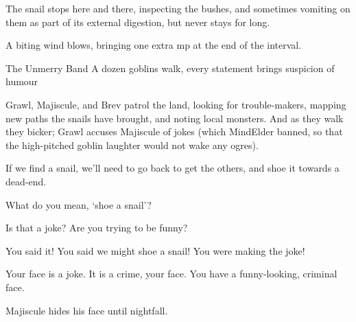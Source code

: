 The snail stops here and there, inspecting the bushes, and sometimes vomiting on them as part of its external digestion, but never stays for long.

A biting wind blows, bringing one extra \gls{mp} at the end of the \gls{interval}.

{The Unmerry Band}%
{A dozen goblins walk, every statement brings suspicion of humour}%

Grawl, Majiscule, and Brev patrol the land, looking for trouble-makers, mapping new paths the snails have brought, and noting local monsters.
And as they walk they bicker; Grawl accuses Majiscule of jokes (which \gls{MindElder} banned, so that the high-pitched goblin laughter would not wake any \glspl{ogre}).

\begin{speechtext}

  If we find a snail, we'll need to go back to get the others, and shoe it towards a dead-end.

  What do you mean, `shoe a snail'?

  Is that a joke?
  Are you trying to be funny?

  You said it!
  You said we might shoe a snail!
  You were making the joke!

  Your face is a joke.
  It is a crime, your face.
  You have a funny-looking, criminal face.

\end{speechtext}

Majiscule hides his face until nightfall.
